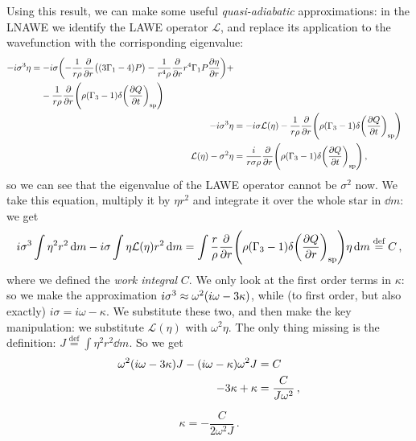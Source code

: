 \documentclass[main.tex]{subfiles}
\begin{document}
Using this result, we can make some useful \emph{quasi-adiabatic} approximations: in the LNAWE we identify the LAWE operator \(\mathcal{L}\), and replace its application to the wavefunction with the corrisponding eigenvalue: 
%
\begin{align}
\begin{split}
- i \sigma^3 \eta  &= 
-i \sigma \qty(- \frac{1}{r \rho } \pdv{}{r} \qty((3\Gamma_1 -4) P) - \frac{1}{r^{4} \rho } \pdv{}{r} r^{4} \Gamma_1 P \pdv{\eta }{r}) + \\
&\phantom{=}\ 
 - \frac{1}{r \rho } \pdv{}{r} 
\qty(\rho (\Gamma_3 -1) \delta \qty(\pdv{Q}{t})_{\text{sp}})
\end{split} 
\\
- i \sigma^3 \eta &= 
- i \sigma \mathcal{L}(\eta ) 
- \frac{1}{r \rho } \pdv{}{r} 
\qty(\rho (\Gamma_3 -1) \delta \qty(\pdv{Q}{t})_{\text{sp}}) \\
\mathcal{L}(\eta ) - \sigma^2 \eta &= 
\frac{i}{r \sigma  \rho } \pdv{}{r} 
\qty(\rho (\Gamma_3 -1) \delta \qty(\pdv{Q}{t})_{\text{sp}})
\,,
\end{align}
%
so we can see that the eigenvalue of the LAWE operator cannot be \(\sigma^2\) now. We take this equation, multiply it by \(\eta r^2\) and integrate it over the whole star in \(\dd{m}\): we get 
%
\begin{align}
i \sigma^3 \int \eta^2r^2 \dd{m} 
- i \sigma \int \eta \mathcal{L}(\eta) r^2 \dd{m}
= \int \frac{r}{\rho } \pdv{}{r} \qty(\rho (\Gamma_3 -1) \delta \qty(\pdv{Q}{r}) _{\text{sp}}) \eta \dd{m}
\overset{\text{def}}{=} C
\,,
\end{align}
%
where we defined the \emph{work integral} \(C\). 
We only look at the first order terms in \(\kappa \): so we make the approximation \(i \sigma^3 \approx \omega^2 \qty(i \omega - 3 \kappa )\), while (to first order, but also exactly) \(i \sigma = i \omega - \kappa \). We substitute these two, and then make the key manipulation: we substitute \(\mathcal{L}(\eta )\) with \(\omega^2 \eta \). 
The only thing missing is the definition: \(J \overset{\text{def}}{=} \int \eta^2 r^2 \dd{m}\).
So we get 
%
\begin{align}
\omega^2 \qty(i \omega - 3 \kappa ) J 
- (i \omega - \kappa ) \omega^2 J &= C \\
- 3 \kappa + \kappa &= \frac{C}{J \omega^2}
\,,
\end{align}
%


%
\begin{equation}
  \kappa = - \frac{C}{2 \omega^2 J }
\,.
\end{equation}
\end{document}
